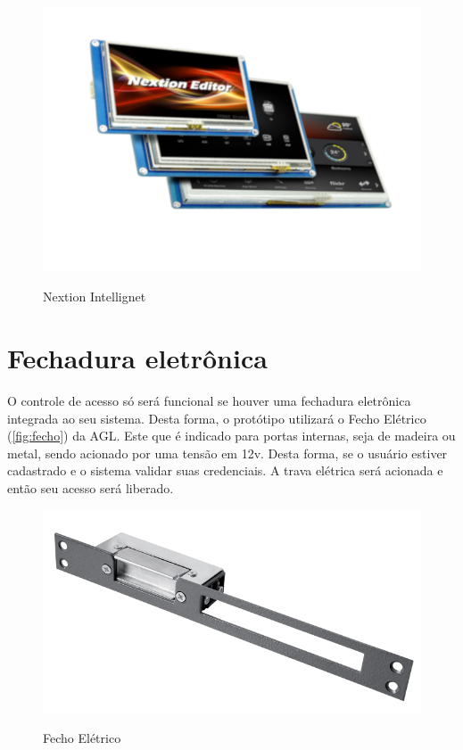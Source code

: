 \begin{figure}[h!]
    \centering
    \caption{Nextion Intellignet}
    \includegraphics[scale=0.3]{figuras/nextion.png} 
    \label{fig:nextion}
    \centering
\end{figure}

\section{Fechadura eletrônica}\label{sec:materiais}

O controle de acesso só será funcional se houver uma fechadura eletrônica 
integrada ao seu sistema. Desta forma, o protótipo utilizará o Fecho Elétrico (\autoref{fig:fecho}) 
da AGL. Este que é indicado para portas internas, seja de madeira ou metal, sendo 
acionado por uma tensão em 12v. Desta forma, se o usuário estiver cadastrado e o sistema validar suas credenciais. 
A trava elétrica será acionada e então seu acesso será liberado.


\begin{figure}[h!]
    \centering
    \caption{Fecho Elétrico}
    \includegraphics[scale=0.3]{figuras/fechoagl.png} 
    \label{fig:fecho}
    \centering
\end{figure}